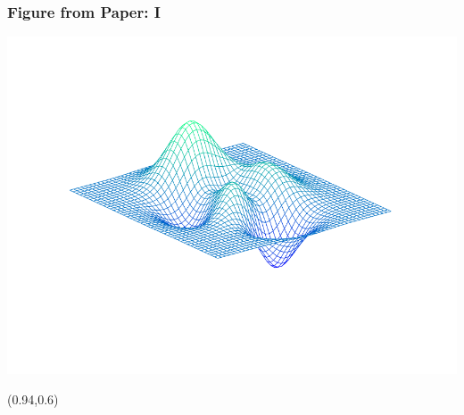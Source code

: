\documentclass[12pt,aspectratio=169,xcolor=dvipsnames,hyperref={colorlinks=true,linkcolor=blue,citecolor=black}]{beamer}
\begin{document}
\begin{frame}[label=figureex]
	\frametitle{Figure from Paper: I}
	\begin{center}
		\includegraphics[trim={0cm 0cm 0cm 1cm},clip,height=0.85\textheight,width=\textwidth,keepaspectratio]{../Figures/Plain/exfigure1}
	\end{center}
	
	\begin{textblock*}{3cm}(0.94\textwidth,0.6\textheight)	%
		\hyperlink{examples}{}
	\end{textblock*}
\end{frame}
\end{document}

